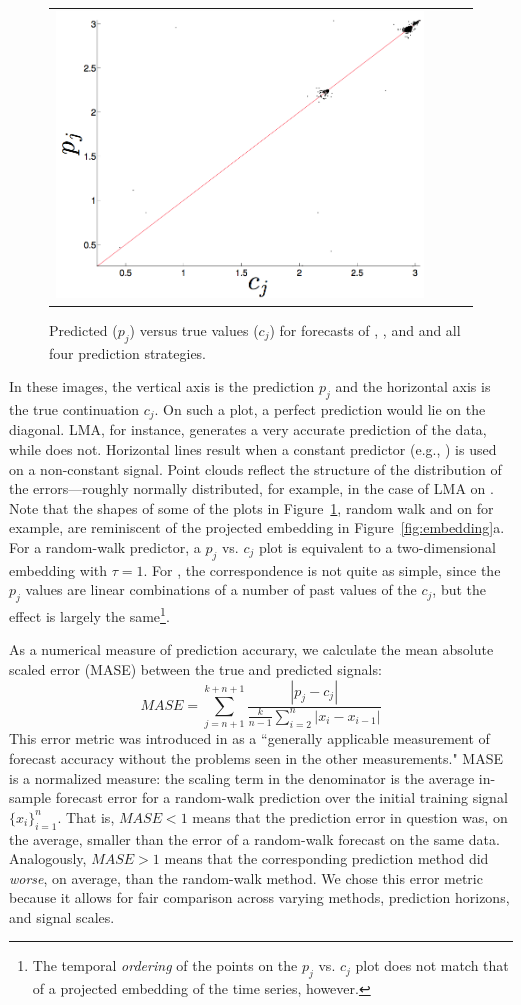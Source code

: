 \begin{figure}
\begin{tabular}{m{}|CCC}
    \includegraphics[width=0.6\columnwidth]{figs/svdfiveLMAForecast}
  \end{tabular}
  \caption{Predicted ($p_j$) versus true values ($c_j$) for forecasts of \col,
     \gcc, and \svdfive and all four prediction strategies.
  }
  \label{fig:forecast-example}
\end{figure}
In these images, the vertical axis is the prediction $p_j$ and the
horizontal axis is the true continuation $c_j$.  On such a plot, a
perfect prediction would lie on the diagonal.  LMA, for instance,
generates a very accurate prediction of the \col data, while \arima
does not.  Horizontal lines result when a constant predictor (e.g.,
\naive) is used on a non-constant signal.  Point clouds reflect the
structure of the distribution of the errors---roughly normally
distributed, for example, in the case of LMA on \gcc.  Note that the
shapes of some of the plots in Figure~\ref{fig:forecast-example}, random walk and \arima on \col for example,  are
reminiscent of the projected embedding in Figure~\ref{fig:embedding}a.
For a random-walk predictor, a $p_j$ vs. $c_j$ plot is equivalent to a
two-dimensional embedding with $\tau=1$.  For \arima, the
correspondence is not quite as simple, since the $p_j$ values are
linear combinations of a number of past values of the $c_j$, but the
effect is largely the same\footnote{The temporal \emph{ordering} of
  the points on the \arima $p_j$ vs. $c_j$ plot does not match that of
  a projected embedding of the time series, however.}.

As a numerical measure of prediction accurary, we calculate the mean
absolute scaled error (MASE) between the true and predicted signals:
%
$$MASE = \sum_{j=n+1}^{k+n+1}\frac{|p_j-c_j|
}{\frac{k}{n-1}\sum^n_{i=2}|x_{i}-x_{i-1}|}$$
%
This error metric was introduced in \cite{MASE} as a ``generally
applicable measurement of forecast accuracy without the problems seen
in the other measurements."  MASE is a normalized measure: the scaling
term in the denominator
%
%
is the average in-sample forecast error for a random-walk prediction
over the initial training signal $\{x_i\}^n_{i=1}$.  That is, $MASE<1$ means that the
prediction error in question was, on the average, smaller than the
error of a random-walk forecast on the same data.  Analogously,
$MASE>1$ means that the corresponding prediction method did
\emph{worse}, on average, than the random-walk method.  We chose this
error metric because it allows for fair comparison across varying
methods, prediction horizons, and signal scales.

